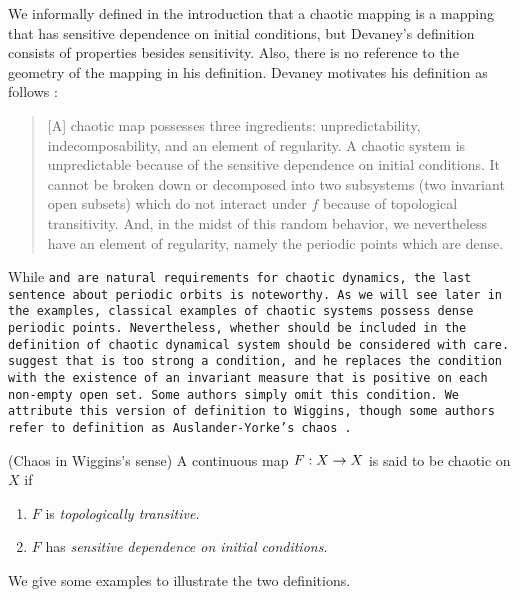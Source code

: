 \documentclass[10pt,draft,twoside]{book}
\begin{document}
We informally defined in the introduction that a chaotic mapping is a mapping that has sensitive dependence on initial conditions, but Devaney's definition consists of properties besides sensitivity.
Also, there is no reference to the geometry of the mapping in his definition.
Devaney motivates his definition as follows \citep[p.50]{devaney}:
\begin{quotation}
  [A] chaotic map possesses three ingredients:
  unpredictability, indecomposability, and an element of regularity.
  A chaotic system is unpredictable because of the sensitive dependence on initial conditions.
  It cannot be broken down or decomposed into two subsystems (two invariant open subsets) which do not interact under $f$ because of topological transitivity.
  And, in the midst of this random behavior, we nevertheless have an element of regularity, namely the periodic points which are dense.
\end{quotation}
While \tt and \sdic are natural requirements for chaotic dynamics, the last sentence about periodic orbits is noteworthy.
As we will see later in the examples, classical examples of chaotic systems possess dense periodic points.
Nevertheless, whether \dpp should be included in the definition of chaotic dynamical system should be considered with care.
\citet{glasner} suggest that \dpp is too strong a condition, and he replaces the condition with the existence of an invariant measure that is positive on each non-empty open set. 
Some authors simply omit this condition.
We attribute this version of definition to Wiggins, though some authors refer to definition as Auslander-Yorke's chaos \citep{blanchard}.
\begin{definition}
  (Chaos in Wiggins's sense)
  A continuous map $F: X\rightarrow X$ is said to be chaotic on $X$ if
  \begin{enumerate}
    \item $F$ is \textit{topologically transitive}.
    \item $F$ has \textit{sensitive dependence on initial conditions}.
  \end{enumerate}
\end{definition}
We give some examples to illustrate the two definitions.
\end{document}
